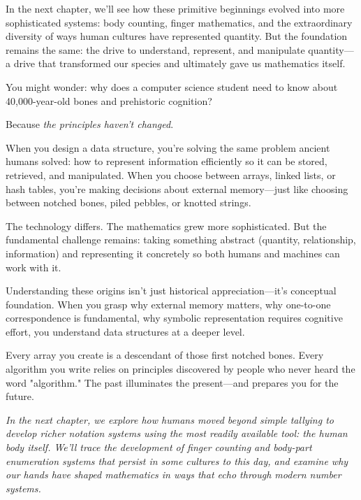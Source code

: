 In the next chapter, we'll see how these primitive beginnings evolved into more sophisticated systems: body counting, finger mathematics, and the extraordinary diversity of ways human cultures have represented quantity. But the foundation remains the same: the drive to understand, represent, and manipulate quantity—a drive that transformed our species and ultimately gave us mathematics itself.
\newpage
\begin{motivation}
	You might wonder: why does a computer science student need to know about 40,000-year-old bones and prehistoric cognition?
	
	Because \textit{the principles haven't changed}.
	
	When you design a data structure, you're solving the same problem ancient humans solved: how to represent information efficiently so it can be stored, retrieved, and manipulated. When you choose between arrays, linked lists, or hash tables, you're making decisions about external memory—just like choosing between notched bones, piled pebbles, or knotted strings.
	
	The technology differs. The mathematics grew more sophisticated. But the fundamental challenge remains: taking something abstract (quantity, relationship, information) and representing it concretely so both humans and machines can work with it.
	
	Understanding these origins isn't just historical appreciation—it's conceptual foundation. When you grasp why external memory matters, why one-to-one correspondence is fundamental, why symbolic representation requires cognitive effort, you understand data structures at a deeper level.
	
	Every array you create is a descendant of those first notched bones. Every algorithm you write relies on principles discovered by people who never heard the word "algorithm." The past illuminates the present—and prepares you for the future.
\end{motivation}

\begin{center}
	\decorativeseparator
\end{center}

\textit{In the next chapter, we explore how humans moved beyond simple tallying to develop richer notation systems using the most readily available tool: the human body itself. We'll trace the development of finger counting and body-part enumeration systems that persist in some cultures to this day, and examine why our hands have shaped mathematics in ways that echo through modern number systems.}